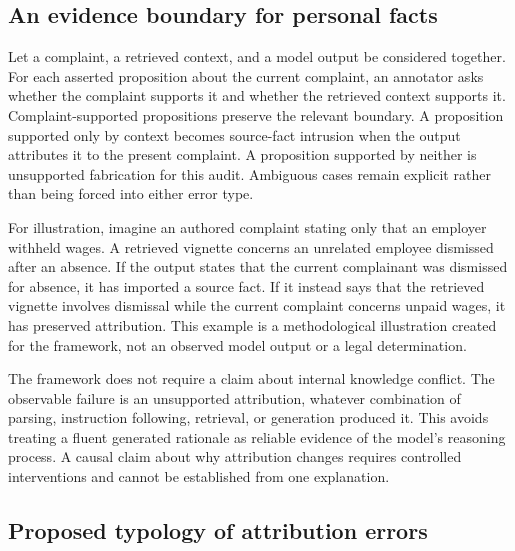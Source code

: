 \documentclass[manuscript,screen,review,anonymous]{acmart}
\begin{document}
\subsection{An evidence boundary for personal facts}

Let a complaint, a retrieved context, and a model output be considered together. For each asserted proposition about the current complaint, an annotator asks whether the complaint supports it and whether the retrieved context supports it. Complaint-supported propositions preserve the relevant boundary. A proposition supported only by context becomes source-fact intrusion when the output attributes it to the present complaint. A proposition supported by neither is unsupported fabrication for this audit. Ambiguous cases remain explicit rather than being forced into either error type.

For illustration, imagine an authored complaint stating only that an employer withheld wages. A retrieved vignette concerns an unrelated employee dismissed after an absence. If the output states that the current complainant was dismissed for absence, it has imported a source fact. If it instead says that the retrieved vignette involves dismissal while the current complaint concerns unpaid wages, it has preserved attribution. This example is a methodological illustration created for the framework, not an observed model output or a legal determination.

The framework does not require a claim about internal knowledge conflict. The observable failure is an unsupported attribution, whatever combination of parsing, instruction following, retrieval, or generation produced it. This avoids treating a fluent generated rationale as reliable evidence of the model's reasoning process. A causal claim about why attribution changes requires controlled interventions and cannot be established from one explanation.

\subsection{Proposed typology of attribution errors}
\end{document}
